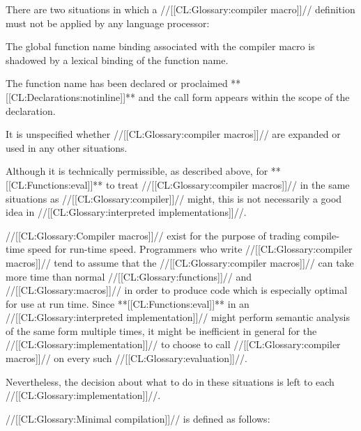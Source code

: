 There are two situations in which a //[[CL:Glossary:compiler macro]]// definition must not be applied by any language processor:

\beginlist \itemitem{\bull}
 The global function name binding associated with the compiler
 macro is shadowed by a lexical binding of the function name.

\itemitem{\bull}
 The function name has been declared or proclaimed **[[CL:Declarations:notinline]]** and
 the call form appears within the scope of the declaration. \endlist

It is unspecified whether //[[CL:Glossary:compiler macros]]// are expanded or used in any other situations.


Although it is technically permissible, as described above, for **[[CL:Functions:eval]]** to treat //[[CL:Glossary:compiler macros]]// in the same situations as //[[CL:Glossary:compiler]]// might, this is not necessarily a good idea in //[[CL:Glossary:interpreted implementations]]//.

//[[CL:Glossary:Compiler macros]]// exist for the purpose of trading compile-time speed for run-time speed.  Programmers who write //[[CL:Glossary:compiler macros]]// tend to assume that the //[[CL:Glossary:compiler macros]]// can take more time than normal //[[CL:Glossary:functions]]// and //[[CL:Glossary:macros]]// in order to produce code which is especially optimal for use at run time.  Since **[[CL:Functions:eval]]** in an //[[CL:Glossary:interpreted implementation]]// might perform semantic analysis of the same form multiple times, it might be  inefficient in general for the //[[CL:Glossary:implementation]]// to choose to call //[[CL:Glossary:compiler macros]]// on every such //[[CL:Glossary:evaluation]]//.

Nevertheless, the decision about what to do in these situations is left to each //[[CL:Glossary:implementation]]//.

\endsubsubsubsubsection%

\endsubsubsubsection%

\endsubsubsection%

 

//[[CL:Glossary:Minimal compilation]]// is defined as follows:

